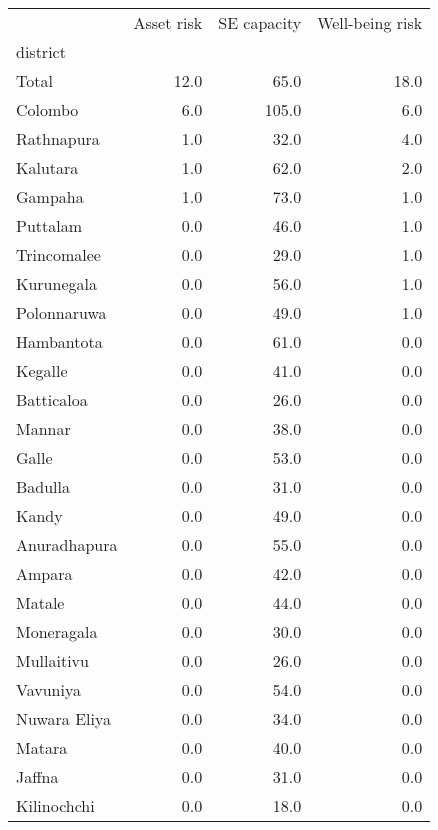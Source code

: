 \begin{tabular}{lrrr}
\toprule
{} &  Asset risk &  SE capacity &  Well-being risk \\
district     &             &              &                  \\
\midrule
Total        &        12.0 &         65.0 &             18.0 \\
Colombo      &         6.0 &        105.0 &              6.0 \\
Rathnapura   &         1.0 &         32.0 &              4.0 \\
Kalutara     &         1.0 &         62.0 &              2.0 \\
Gampaha      &         1.0 &         73.0 &              1.0 \\
Puttalam     &         0.0 &         46.0 &              1.0 \\
Trincomalee  &         0.0 &         29.0 &              1.0 \\
Kurunegala   &         0.0 &         56.0 &              1.0 \\
Polonnaruwa  &         0.0 &         49.0 &              1.0 \\
Hambantota   &         0.0 &         61.0 &              0.0 \\
Kegalle      &         0.0 &         41.0 &              0.0 \\
Batticaloa   &         0.0 &         26.0 &              0.0 \\
Mannar       &         0.0 &         38.0 &              0.0 \\
Galle        &         0.0 &         53.0 &              0.0 \\
Badulla      &         0.0 &         31.0 &              0.0 \\
Kandy        &         0.0 &         49.0 &              0.0 \\
Anuradhapura &         0.0 &         55.0 &              0.0 \\
Ampara       &         0.0 &         42.0 &              0.0 \\
Matale       &         0.0 &         44.0 &              0.0 \\
Moneragala   &         0.0 &         30.0 &              0.0 \\
Mullaitivu   &         0.0 &         26.0 &              0.0 \\
Vavuniya     &         0.0 &         54.0 &              0.0 \\
Nuwara Eliya &         0.0 &         34.0 &              0.0 \\
Matara       &         0.0 &         40.0 &              0.0 \\
Jaffna       &         0.0 &         31.0 &              0.0 \\
Kilinochchi  &         0.0 &         18.0 &              0.0 \\
\bottomrule
\end{tabular}
